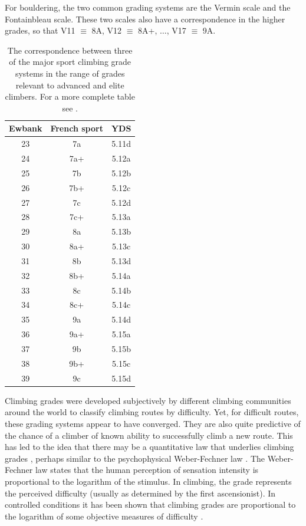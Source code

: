 \documentclass{article}
\begin{document}
For bouldering, the two common grading systems are the Vermin scale and the Fontainbleau scale. These two scales also have a correspondence in the higher grades, so that V11 $\equiv$ 8A, V12 $\equiv$ 8A+, $\dots$, V17 $\equiv$ 9A.


\begin{table}
\centering
\begin{tabular}{| c | c | c |}
  \hline			
  {\bf Ewbank} & {\bf French sport} & {\bf YDS} \\
  \hline			
  23 & 7a & 5.11d \\
  24 & 7a+ & 5.12a \\
  25 & 7b & 5.12b \\
  26 & 7b+ & 5.12c \\
  27 & 7c & 5.12d \\
  28 & 7c+ & 5.13a \\
  29 & 8a & 5.13b \\
  30 & 8a+ & 5.13c \\
  31 & 8b & 5.13d \\
  32 & 8b+ & 5.14a \\
  33 & 8c & 5.14b \\
  34 & 8c+ & 5.14c \\
  35 & 9a & 5.14d \\
  36 & 9a+ & 5.15a \\
  37 & 9b & 5.15b \\
  38 & 9b+ & 5.15c \\
  39 & 9c & 5.15d \\
  \hline  
\end{tabular}
\caption{The correspondence between three of the major sport climbing grade systems in the range of grades relevant to advanced and elite climbers. For a more complete table see \cite{draper2015comparative}. }
\label{table1}
\end{table}

Climbing grades were developed subjectively by different climbing communities around the world to classify climbing routes by difficulty. Yet, for difficult routes, these grading systems appear to have converged. They are also quite predictive of the chance of a climber of known ability to successfully climb a new route.  This has led to the idea that there may be a quantitative law that underlies climbing grades \cite{delignieres1993psychophysical}, perhaps similar to the psychophysical Weber-Fechner law \cite{1834pulsu,fechner1860}. The Weber-Fechner law states that the human perception of sensation intensity is proportional to the logarithm of the stimulus.  In climbing, the grade represents the perceived difficulty (usually as determined by the first ascensionist). In controlled conditions it has been shown that climbing grades are proportional to the logarithm of some objective measures of difficulty \cite{delignieres1993psychophysical}. 
\end{document}
